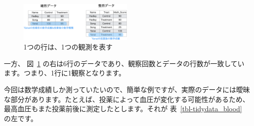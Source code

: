 \documentclass[
  a4paper,
  pandoc,
  ja=standard,
  jafont=haranoaji]{bxjsbook}
\begin{document}
\begin{figure}

{\centering \includegraphics[width=0.5\textwidth,height=\textheight]{./Figs/Tidydata/TidyData2.png}

}

\caption{\label{fig-tidydata_example2}1つの行は、1つの観測を表す}

\end{figure}

一方、 図~\ref{fig-tidydata_example2}
の右は6行のデータであり、観察回数とデータの行数が一致しています。つまり、1行に1観察となります。

今回は数学成績しか測っていたいので、簡単な例ですが、実際のデータには曖昧な部分があります。たとえば、投薬によって血圧が変化する可能性があるため、最高血圧もまた投薬前後に測定したとします。それが
表~\ref{tbl-tidydata_blood} の左です。
\end{document}
